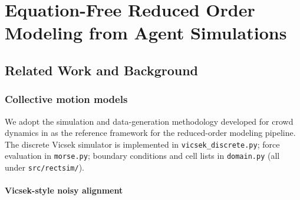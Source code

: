\documentclass{report}
\theoremstyle{plain}
\theoremstyle{remark}
\numberwithin{equation}{section}              %
\begin{document}
%
\part{Equation-Free Reduced Order Modeling from Agent Simulations}

%
\chapter{Related Work and Background}
\label{ch:background}

\section{Collective motion models}

We adopt the simulation and data-generation methodology developed for crowd dynamics in \cite{alvarez2025eqfree} as the reference framework for the reduced-order modeling pipeline.
The discrete Vicsek simulator is implemented in \texttt{vicsek\_discrete.py}; force
evaluation in \texttt{morse.py}; boundary conditions and cell lists in
\texttt{domain.py} (all under \texttt{src/rectsim/}).

\subsection{Vicsek-style noisy alignment}
\end{document}
